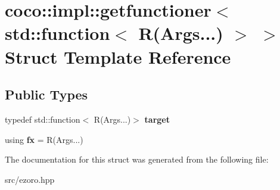 \hypertarget{structcoco_1_1impl_1_1getfunctioner_3_01std_1_1function_3_01_r_07_args_8_8_8_08_01_4_01_4}{\section{coco\-:\-:impl\-:\-:getfunctioner$<$ std\-:\-:function$<$ R(Args...) $>$ $>$ Struct Template Reference}
\label{structcoco_1_1impl_1_1getfunctioner_3_01std_1_1function_3_01_r_07_args_8_8_8_08_01_4_01_4}
}
\subsection*{Public Types}
\begin{DoxyCompactItemize}
\item 
\hypertarget{structcoco_1_1impl_1_1getfunctioner_3_01std_1_1function_3_01_r_07_args_8_8_8_08_01_4_01_4_a8a0ab3a18eea8ead50fed7ac6e9670b2}{typedef std\-::function$<$ R(Args...)$>$ {\bfseries target}}\label{structcoco_1_1impl_1_1getfunctioner_3_01std_1_1function_3_01_r_07_args_8_8_8_08_01_4_01_4_a8a0ab3a18eea8ead50fed7ac6e9670b2}

\item 
\hypertarget{structcoco_1_1impl_1_1getfunctioner_3_01std_1_1function_3_01_r_07_args_8_8_8_08_01_4_01_4_a4473bf83da1d20b603ae38bf5b6e1977}{using {\bfseries fx} = R(Args...)}\label{structcoco_1_1impl_1_1getfunctioner_3_01std_1_1function_3_01_r_07_args_8_8_8_08_01_4_01_4_a4473bf83da1d20b603ae38bf5b6e1977}

\end{DoxyCompactItemize}


The documentation for this struct was generated from the following file\-:\begin{DoxyCompactItemize}
\item 
src/ezoro.\-hpp\end{DoxyCompactItemize}
